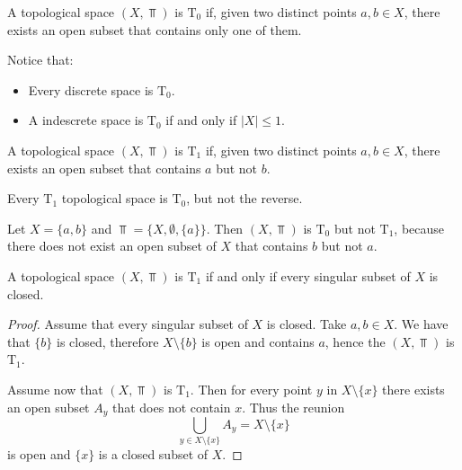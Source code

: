 \documentclass[../../main/main.tex]{subfiles}
\begin{document}
\begin{definition}
  A topological space $(X, \Top)$ is $\mathrm{T}_{0}$ if, given two distinct points $a, b \in X$, there exists an open subset that contains only one of them.
\end{definition}

 Notice that:
 \begin{itemize}
    \item Every discrete space is $\mathrm{T}_{0}$.
   \item A indescrete space is $\mathrm{T}_{0}$ if and only if $ | X | \leq 1$.
\end{itemize}

\begin{definition}
  A topological space $(X, \Top)$ is $\mathrm{T}_{1}$ if, given two distinct points $a, b \in X$, there exists an open subset that contains $a$ but not $b$.
\end{definition}

\begin{remark}
  Every $\mathrm{T}_{1}$ topological space is $\mathrm{T}_{0}$, but not the reverse.
\end{remark}

\begin{example}
  Let $X = \{a, b\}$ and $\Top = \{X, \emptyset, \{a\}\}$. Then $(X, \Top)$ is $\mathrm{T}_{0}$ but not $\mathrm{T}_{1}$, because there does not exist an open subset of $X$ that contains $b$ but not $a$.
\end{example}

\begin{theorem}
  A topological space $(X, \Top)$ is $\mathrm{T}_{1}$ if and only if every singular subset of $X$ is closed.
\end{theorem}

\begin{proof}
  Assume that every singular subset of $X$ is closed. Take $a, b \in X$. We have that $\{b\}$ is closed, therefore $X \setminus \{b\}$ is open and contains $a$, hence the $(X, \Top)$ is $\mathrm{T}_{1}$.

  Assume now that $(X, \Top)$ is $\mathrm{T}_{1}$. Then for every point $y$ in $X \setminus \{x\}$ there exists an open subset $A_{y}$ that does not contain $x$. Thus the reunion
  \begin{equation*}
    \bigcup_{y \in X \setminus \{x\}} A_{y} = X \setminus \{x\}
  \end{equation*}
  is open and $\{x\}$ is a closed subset of $X$.
\end{proof}
\end{document}
